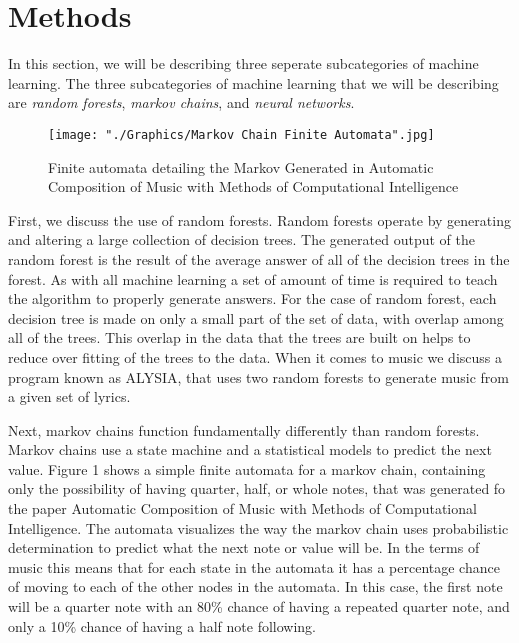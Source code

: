 \documentclass{sig-alternate}
\begin{document}
\section{Methods}
\label{sec:methods}

	In this section, we will be describing three seperate subcategories of machine learning. The three subcategories of machine learning that we will be describing are \textit{random forests},\textit{ markov chains}, and \textit{neural networks}. 



\begin{figure}[H]
	\texttt{[image: "./Graphics/Markov Chain Finite Automata".jpg]}
	\caption{Finite automata detailing the Markov Generated in Automatic Composition of Music with Methods of Computational Intelligence}
	\label{fig:markovchain1}
\end{figure}
	First, we discuss the use of random forests. Random forests operate by generating and altering a large collection of decision trees. The generated output of the random forest is the result of the average answer of all of the decision trees in the forest. As with all machine learning a set of amount of time is required to teach the algorithm to properly generate answers. For the case of random forest, each decision tree is made on only a small part of the set of data, with overlap among all of the trees. This overlap in the data that the trees are built on helps to reduce over fitting of the trees to the data. When it comes to music we discuss a program known as ALYSIA, that uses two random forests to generate music from a given set of lyrics.
	
	Next, markov chains function fundamentally differently than random forests. Markov chains use a state machine and a statistical models to predict the next value. Figure 1 shows a simple finite automata for a markov chain, containing only the possibility of having quarter, half, or whole notes, that was generated fo the paper Automatic Composition of Music with Methods of Computational Intelligence. The automata visualizes the way the markov chain uses probabilistic determination to predict what the next note or value will be. In the terms of music this means that for each state in the automata it has a percentage chance of moving to each of the other nodes in the automata. In this case, the first note will be a quarter note with an 80\% chance of having a repeated quarter note, and only a 10\% chance of having a half note following.
\end{document}
